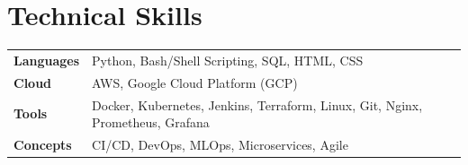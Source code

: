 \documentclass[letterpaper,11pt]{article}
\begin{document}
\section{Technical Skills}

\begin{tabularx}{\textwidth}{@{}>{\bfseries}p{3cm}X@{}}
Languages & Python, Bash/Shell Scripting, SQL, HTML, CSS \\
Cloud & AWS, Google Cloud Platform (GCP) \\
Tools & Docker, Kubernetes, Jenkins, Terraform, Linux, Git, Nginx, Prometheus, Grafana \\
Concepts & CI/CD, DevOps, MLOps, Microservices, Agile \\
\end{tabularx}





\end{document}
